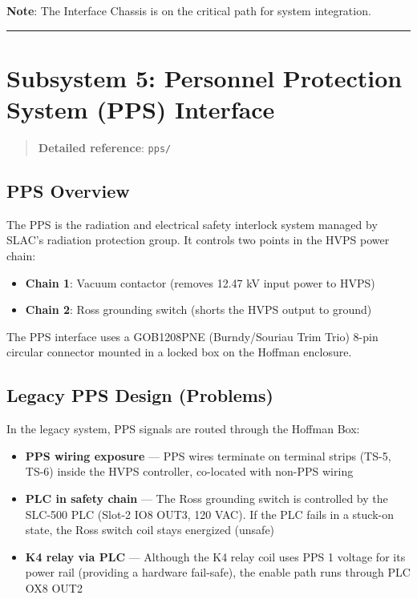 \textbf{Note}: The Interface Chassis is on the critical path for system integration.

\begin{center}\rule{0.5\linewidth}{0.5pt}\end{center}

\section{Subsystem 5: Personnel Protection System (PPS) Interface}\label{subsystem-5-personnel-protection-system-pps-interface}

\begin{quote}
\textbf{Detailed reference}: \texttt{pps/}
\end{quote}

\subsection{PPS Overview}\label{pps-overview}

The PPS is the radiation and electrical safety interlock system managed by SLAC's radiation protection group. It controls two points in the HVPS power chain:

\begin{itemize}
\tightlist
\item
  \textbf{Chain 1}: Vacuum contactor (removes 12.47 kV input power to HVPS)
\item
  \textbf{Chain 2}: Ross grounding switch (shorts the HVPS output to ground)
\end{itemize}

The PPS interface uses a GOB1208PNE (Burndy/Souriau Trim Trio) 8-pin circular connector mounted in a locked box on the Hoffman enclosure.

\subsection{Legacy PPS Design (Problems)}\label{legacy-pps-design-problems}

In the legacy system, PPS signals are routed through the Hoffman Box:

\begin{itemize}
\tightlist
\item
  \textbf{PPS wiring exposure} --- PPS wires terminate on terminal strips (TS-5, TS-6) inside the HVPS controller, co-located with non-PPS wiring
\item
  \textbf{PLC in safety chain} --- The Ross grounding switch is controlled by the SLC-500 PLC (Slot-2 IO8 OUT3, 120 VAC). If the PLC fails in a stuck-on state, the Ross switch coil stays energized (unsafe)
\item
  \textbf{K4 relay via PLC} --- Although the K4 relay coil uses PPS 1 voltage for its power rail (providing a hardware fail-safe), the enable path runs through PLC OX8 OUT2
\end{itemize}

